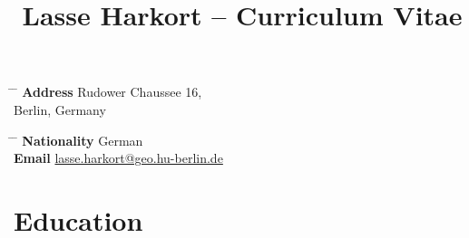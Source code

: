 \documentclass[10pt]{article} %
\begin{document}

\title{Lasse Harkort -- Curriculum Vitae} %


\parbox{0.5\textwidth}{ %
\begin{tabbing} %
\hspace{3cm} \= \hspace{4cm} \= \kill %
{\bf Address} \> Rudower Chaussee 16,\\ %
 Berlin, Germany %
\end{tabbing}}
\hfill %
\parbox{0.5\textwidth}{ %
\begin{tabbing} %
\hspace{3cm} \= \hspace{4cm} \= \kill %
{\bf Nationality} \> German \\ %
{\bf Email} \> \href{mailto:lasse.harkort@geo.hu-berlin.de}{lasse.harkort@geo.hu-berlin.de} \\ %
\end{tabbing}}


\vspace{6mm}
\section*{Education}
\end{document}
